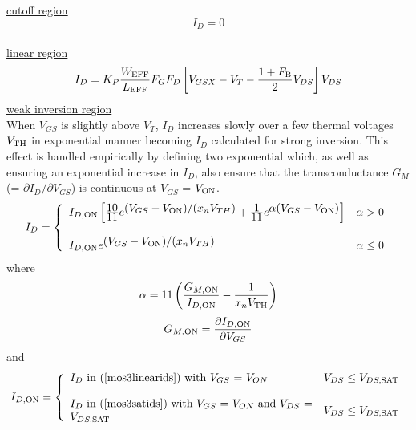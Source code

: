 \underline{cutoff region}
\begin{equation}
I_{D} = 0
\end{equation}\\[0.2in]
%
%
\underline{linear region}
\begin{equation}
 I_{D} =  K_P {{W_{\mbox{\scriptsize EFF}}}\over{ L_{\mbox{\scriptsize EFF}}}} F_G F_D
           \left[ V_{GSX} - V_T - {{1 + F_{\mbox{\scriptsize B}}} \over 2} V_{DS}
	   \right] V_{DS}
      \label{mos3linearids}
\end{equation}
%
%
\underline{weak inversion region}\\[0.1in]
When $V_{GS}$ is slightly above $V_T$, $I_{D}$ increases slowly over a few
thermal voltages $V_{\mbox{\scriptsize TH}}$ in
exponential manner becoming $I_{D}$ calculated for strong inversion.
This effect is handled empirically by defining two exponential which,
as well as ensuring an exponential increase in $I_{D}$, also ensure that
the transconductance $G_M$ (= $\partial I_{D}/\partial V_{GS}$) is
continuous at $V_{GS}$ = $V_{\mbox{\scriptsize ON}}$.
\begin{equation}
I_{D} = \left\{ \begin{array}{ll}
         I_{D,\ms{ON}}
         \left[ {{\textstyle 10}\over{\textstyle 11}}
         e^{\textstyle (V_{GS}-V_{\ms{ON}})/(x_nV_{TH})}
       + {{\textstyle 1}\over{\textstyle 11}}
         e^{\textstyle \alpha (V_{GS}-V_{\ms{ON}})} \right]  &  \alpha > 0 \\
         \\
         I_{D,\ms{ON}}
         e^{\textstyle (V_{GS}-V_{\ms{ON}})/(x_nV_{TH})}
         &  \alpha \le 0 
         \end{array} \right. %
\end{equation}
where
\begin{equation}
\alpha = 11 \left( {{\textstyle G_{M,\mbox{\scriptsize ON}}}
         \over {\textstyle I_{D,\mbox{\scriptsize ON}}}}
         - {{\textstyle 1} \over {\textstyle
         x_n V_{\mbox{\scriptsize TH}}}}
         \right)
\end{equation}
\begin{equation}
G_{M,\mbox{\scriptsize ON}} = {{\partial I_{D,\mbox{\scriptsize ON}}} \over {\partial V_{GS}}}
\end{equation}
and
\begin{equation}
I_{D,\ms{ON}} =  \left\{ \begin{array}{ll}
                  \parbox{3in}{$I_{D}$ in (\ref{mos3linearids})
                               with $V_{GS}$ = $V_{ON}$}
                  & V_{DS} \le V_{DS,\ms{SAT}} \\ \\
                  \parbox{3in}{$I_{D}$ in (\ref{mos3satids})
                               with $V_{GS}$ = $V_{ON}$ and
                               $V_{DS}$ = $V_{DS,\ms{SAT}}$}
                  & V_{DS} \le V_{DS,\ms{SAT}}
                  \end{array} \right. %
\end{equation}

